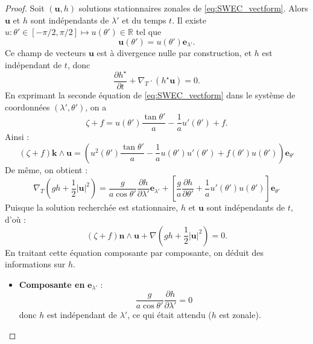 \begin{proof}
Soit $(\mathbf{u}, h)$ solutions stationnaires zonales de \eqref{eq:SWEC_vectform}. Alors $\mathbf{u}$ et $h$ sont indépendants de $\lambda'$ et du temps $t$. Il existe $u : \theta' \in [-\pi/2, \pi/2] \mapsto u(\theta') \in \mathbb{R}$ tel que
\begin{equation}
\mathbf{u}(\theta') = u(\theta')\mathbf{e}_{\lambda'}.
\end{equation}
Ce champ de vecteurs $\mathbf{u}$ est à divergence nulle par construction, et $h$ est indépendant de $t$, donc
\begin{equation}
\dfrac{\partial h^{\star}}{\partial t} + \nabla_T \cdot (h^{\star} \mathbf{u}) = 0.
\end{equation}
En exprimant la seconde équation de \eqref{eq:SWEC_vectform} dans le système de coordonnées $(\lambda',\theta')$, on a
\begin{equation}
\zeta + f = u(\theta') \dfrac{\tan \theta'}{a} - \dfrac{1}{a} u'(\theta') + f.
\end{equation}
Ainsi :
\begin{equation}
\left( \zeta + f \right) \mathbf{k} \wedge \mathbf{u} = \left( u^2 (\theta') \dfrac{\tan \theta'}{a} - \dfrac{1}{a} u(\theta') u'(\theta') + f(\theta') u(\theta') \right) \mathbf{e}_{\theta'}
\end{equation}
De même, on obtient :
\begin{equation}
\nabla_T \left( gh + \dfrac{1}{2} |\mathbf{u}|^2 \right) = \dfrac{g}{a \cos \theta'} \dfrac{\partial h}{\partial \lambda'} \mathbf{e}_{\lambda'} + \left[ \dfrac{g}{a} \dfrac{\partial h}{\partial \theta'} + \dfrac{1}{a} u'(\theta') u(\theta') \right] \mathbf{e}_{\theta'}
\end{equation}
Puisque la solution recherchée est stationnaire, $h$ et $\mathbf{u}$ sont indépendants de $t$, d'où :
\begin{equation}
\left( \zeta + f \right) \mathbf{n} \wedge \mathbf{u} + \nabla \left( gh + \dfrac{1}{2} |\mathbf{u}|^2 \right) = 0.
\end{equation}
En traitant cette équation composante par composante, on déduit des informations sur $h$.
\begin{itemize}
\item \textbf{Composante en} $\mathbf{e}_{\lambda'}$ : 
\begin{equation}
\dfrac{g}{a \cos \theta'} \dfrac{\partial h}{\partial \lambda'} = 0
\end{equation}
donc $h$ est indépendant de $\lambda'$, ce qui était attendu ($h$ est zonale).


\end{itemize}
\end{proof}
